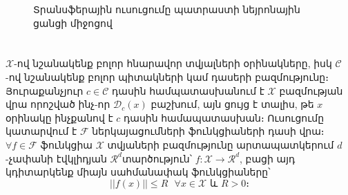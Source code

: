 \documentclass[12pt]{article}
\begin{document}
\begin{figure}[h]
\caption{Տրանսֆերային ուսուցումը պատրաստի նեյրոնային ցանցի միջոցով } \label{fig:ml_vs_tl}
\end{figure}









\pagebreak


\section*{
 } \noindent
{}
{}
 
 $\mathcal{X}$-ով նշանակենք բոլոր հնարավոր տվյալների օրինակները, իսկ $\mathcal{C}$-ով նշանակենք բոլոր պիտակների կամ դասերի բազմությունը։ Յուրաքանչյուր $c \in \mathcal{C}$ դասին համպատասխանում է $\mathcal{X}$ բազմության վրա որոշված ինչ-որ $\mathcal{D}_c(x)$ բաշխում, այն ցույց է տալիս, թե $x$ օրինակը ինչքանով է $c$ դասին համապատասխան։ Ուսուցումը կատարվում է $\mathcal{F}$ ներկայացումների ֆունկցիաների դասի վրա։ $\forall f \in \mathcal{F}$  ֆունկցիա $\mathcal{X}$ տվյաների բազմությունը արտապատկերում $d$-չափանի էվկլիդյան $\mathcal{R}^d$տարծություն՝ $f:\mathcal{X}\rightarrow\mathcal{R}^d$, բացի այդ կդիտարկենք միայն սահմանափակ ֆունկցիաները՝
 $$||f(x)|| \leq R \text{    } \forall x \in \mathcal{X} \text{ և } R > 0։$$ 


\end{document}
